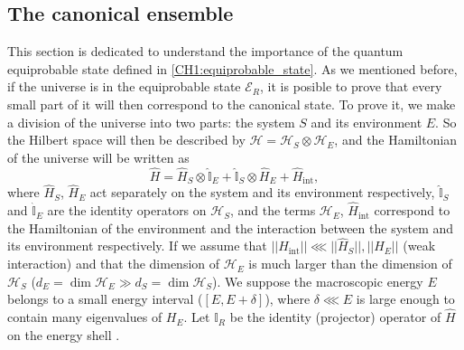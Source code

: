 \subsection{The canonical ensemble}

This section is dedicated to understand the importance of the quantum equiprobable state defined in \eqref{CH1:equiprobable_state}. As we mentioned before, if the universe is in the equiprobable state $\mathcal{E}_R$, it is posible to prove that every small part of it will then correspond to the canonical state. To prove it, we make a division of the universe into two parts: the system $S$ and its environment $E$. So the Hilbert space will then be described by $\mathcal{H}=\mathcal{H}_{S}\otimes\mathcal{H}_E$, and the Hamiltonian of the universe will be written as
\begin{equation}
\hat{H}=\hat{H}_{S} \otimes \hat{\mathbb{I}}_{E}+\hat{\mathbb{I}}_{S} \otimes \hat{H}_{E}+\hat{H}_{\mathrm{int}},
\label{CH1:Hamiltonian_split_env_system}
\end{equation}
where $\hat{H}_S$, $\hat{H}_E$ act separately on the system and its environment respectively, $\hat{\mathbb{I}}_{S}$ and $\hat{\mathbb{I}}_{E}$ are the identity operators on $\mathcal{H}_S$, and the terms $\mathcal{H}_E$, $\hat{H}_{\mathrm{int}}$ correspond to the Hamiltonian of the environment and the interaction between the system and its environment respectively. If we assume that 
$||\hat{H}_{\mathrm{int}}||\lll ||\hat{H}_{S}||, ||H_{E}||$ (weak interaction) and that the dimension of $\mathcal{H}_E$ is much larger than the dimension of $\mathcal{H}_S$ ($d_{E}=\operatorname{dim} \mathcal{H}_{E} \gg d_{S}=\operatorname{dim} \mathcal{H}_{S}$). We suppose the macroscopic energy $E$ belongs to a small energy interval ($[E,E+\delta]$), where $\delta\lll E$ is large enough to contain many eigenvalues of $H_E$. Let $\mathbb{I}_{R}$ be the identity (projector) operator of $\hat{H}$ on the energy shell .


